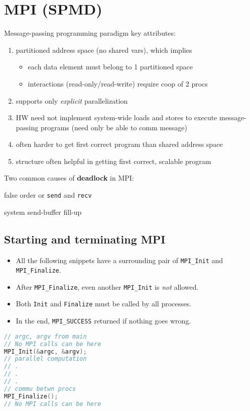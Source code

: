 \section*{MPI (SPMD)}
Message-passing programming paradigm key attributes:
\begin{enumerate}
\item partitioned address space (no shared vars), which implies
  \begin{itemize}
  \item each data element must belong to 1 partitioned space
  \item interactions (read-only/read-write) require coop of 2 procs
  \end{itemize}
\item supports only \emph{explicit} parallelization
\item HW need not implement system-wide loads and stores to execute message-passing programs (need only be able to comm message)
\item often harder to get first correct program than shared address space
\item structure often helpful in getting first correct, scalable program
\end{enumerate}
Two common causes of \textbf{deadlock} in MPI:
\begin{enumerate*}
\item false order or \texttt{send} and \texttt{recv}
\item system send-buffer fill-up
\end{enumerate*}

\subsection*{Starting and terminating MPI}
\begin{minipage}{0.5\linewidth}
  \begin{itemize}
  \item All the following snippets have a surrounding pair of \texttt{MPI\_Init} and \texttt{MPI\_Finalize}.
  \item After \texttt{MPI\_Finalize}, even another \texttt{MPI\_Init} is \emph{not} allowed.
  \item Both \texttt{Init} and \texttt{Finalize} must be called by all processes.
  \item In the end, \texttt{MPI\_SUCCESS} returned if nothing goes wrong.
  \end{itemize}
\end{minipage}
\begin{minipage}{0.48\linewidth}
\begin{lstlisting}[language=c,xleftmargin=1pt]
// argc, argv from main
// No MPI calls can be here
MPI_Init(&argc, &argv);
// parallel computation
// .
// .
// .
// commu betwn procs
MPI_Finalize();
// No MPI calls can be here
\end{lstlisting}
\end{minipage}


